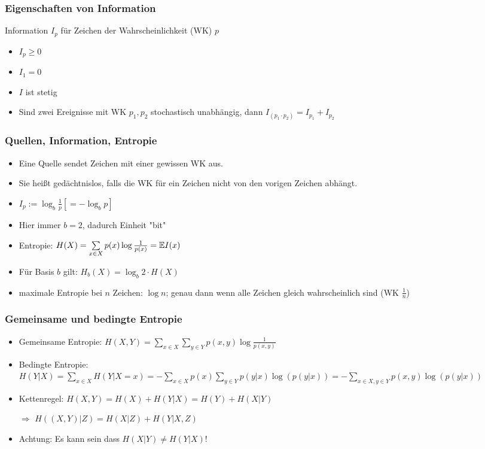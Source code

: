 \documentclass{beamer}
\newcommand{\E}{\ensuremath \mathbb{E}}
\begin{document}
\begin{frame}
\frametitle{Eigenschaften von Information}
Information $I_p$ für Zeichen der Wahrscheinlichkeit (WK) $p$
\begin{itemize}
\item $I_p\geq 0$
\item $I_1=0$
\item $I$ ist stetig
\item Sind zwei Ereignisse mit WK $p_1,p_2$ stochastisch unabhängig, dann $I_{(p_1\cdot p_2)}=I_{p_1}+I_{p_2}$
\end{itemize}
\end{frame}

\begin{frame}
\frametitle{Quellen, Information, Entropie}
\begin{itemize}
\item Eine Quelle sendet Zeichen mit einer gewissen WK aus.\pause
\item Sie heißt gedächtnislos, falls die WK für ein Zeichen nicht von den vorigen Zeichen abhängt.\pause
\item $I_p:=\log_b\frac{1}{p} [=-\log_b p]$
\item Hier immer $b=2$, dadurch Einheit "bit"\pause
\item Entropie: $H(X)=\sum\limits_{x\in X}p(x)\log\frac{1}{p(x)}=\E I(x)$\pause
\item Für Basis $b$ gilt: $H_b(X) = \log_b 2\cdot H(X)$\pause
\item maximale Entropie bei $n$ Zeichen: $\log n$; genau dann wenn alle Zeichen gleich wahrscheinlich sind (WK $\frac{1}{n}$)
\end{itemize}
\end{frame}

\begin{frame}
\frametitle{Gemeinsame und bedingte Entropie}
\begin{itemize}
\item Gemeinsame Entropie: $H(X,Y)=\sum\limits_{x\in X}\sum\limits_{y\in Y}p(x,y)\log\frac{1}{p(x,y)}$\pause
\item Bedingte Entropie: $H(Y|X)=\sum\limits_{x\in X}H(Y|X=x)=-\sum\limits_{x\in X}p(x)\sum\limits_{y\in Y}p(y|x)\log(p(y|x))=-\sum\limits_{x\in X,y\in Y}p(x,y)\log(p(y|x))$
\pause
\item Kettenregel: $H(X,Y)=H(X)+H(Y|X)=H(Y)+H(X|Y)$
\item[$\Rightarrow$] $H((X,Y)|Z)=H(X|Z)+H(Y|X,Z)$
\item  Achtung: Es kann sein dass $H(X|Y)\neq H(Y|X)$!
\end{itemize}
\end{frame}
\end{document}
